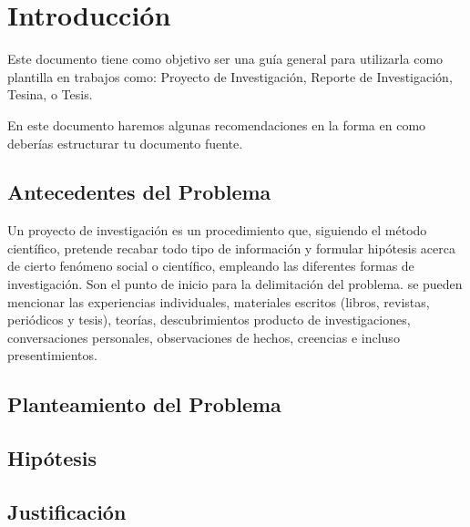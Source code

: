 \chapter{Introducción}
Este documento tiene como objetivo ser una guía general para utilizarla como plantilla
en trabajos como: Proyecto de Investigación, Reporte de Investigación, Tesina, o Tesis.

En este documento haremos algunas recomendaciones en la forma en como deberías estructurar
tu documento fuente.

\section{Antecedentes del Problema}

Un proyecto de investigación es un procedimiento que, siguiendo el
método científico, pretende recabar todo tipo de información y
formular hipótesis acerca de cierto fenómeno social o científico,
empleando las diferentes formas de investigación.
\vspace{20}
Son el punto de inicio para la delimitación del problema. se pueden
mencionar las experiencias individuales, materiales escritos
(libros, revistas, periódicos y tesis), teorías, descubrimientos
producto de investigaciones, conversaciones personales,
observaciones de hechos, creencias e incluso presentimientos.



\section{Planteamiento del Problema}

\section{Hipótesis}
\label{sec:hipotesis}



\section{Justificación}

